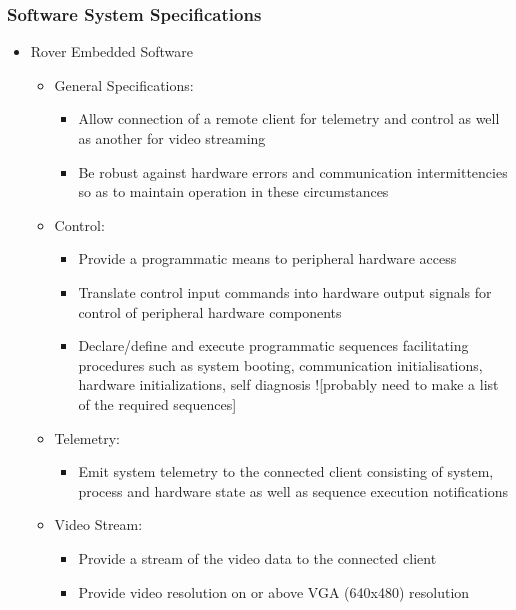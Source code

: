     \subsubsection{Software System Specifications}
      \begin{itemize}
        \item Rover Embedded Software
        \begin{itemize}
          \item General Specifications:
          \begin{itemize}
            \item Allow connection of a remote client for telemetry and control as well as another for video streaming
            \item Be robust against hardware errors and communication intermittencies so as to maintain operation in these circumstances
          \end{itemize}
          \item Control:
          \begin{itemize}
            \item Provide a programmatic means to peripheral hardware access
            \item Translate control input commands into hardware output signals for control of peripheral hardware components
            \item Declare/define and execute programmatic sequences facilitating procedures such as system booting, communication initialisations, hardware initializations, self diagnosis ![probably need to make a list of the required sequences]
          \end{itemize}
          \item Telemetry:
          \begin{itemize}
            \item Emit system telemetry to the connected client consisting of system, process and hardware state as well as sequence execution notifications
          \end{itemize}
          \item Video Stream:
          \begin{itemize}
            \item Provide a stream of the video data to the connected client
            \item Provide video resolution on or above VGA (640x480) resolution
          \end{itemize}
        \end{itemize}
        

\end{itemize}
